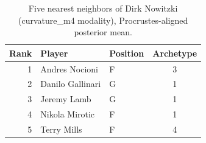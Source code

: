 \begin{table}[htbp]
  \centering\small
  \begin{tabular}{rllc}
    \toprule
    Rank & Player & Position & Archetype \\
    \midrule
    1 & Andres Nocioni & F & 3 \\
    2 & Danilo Gallinari & G & 1 \\
    3 & Jeremy Lamb & G & 1 \\
    4 & Nikola Mirotic & F & 1 \\
    5 & Terry Mills & F & 4 \\
    \bottomrule
  \end{tabular}
  \caption{Five nearest neighbors of Dirk Nowitzki (curvature_m4 modality), Procrustes-aligned posterior mean.}
  \label{tab:Dirk_Nowitzki_neighbors_curvature_m4}
\end{table}

